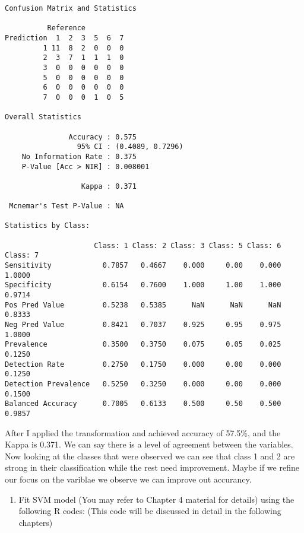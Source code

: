 \documentclass[
  letterpaper,
  DIV=11,
  numbers=noendperiod]{scrartcl}
\providecommand{\tightlist}{%
  \setlength{\itemsep}{0pt}\setlength{\parskip}{0pt}}\usepackage{longtable,booktabs,array}
\begin{document}
\begin{verbatim}
Confusion Matrix and Statistics

          Reference
Prediction  1  2  3  5  6  7
         1 11  8  2  0  0  0
         2  3  7  1  1  1  0
         3  0  0  0  0  0  0
         5  0  0  0  0  0  0
         6  0  0  0  0  0  0
         7  0  0  0  1  0  5

Overall Statistics
                                          
               Accuracy : 0.575           
                 95% CI : (0.4089, 0.7296)
    No Information Rate : 0.375           
    P-Value [Acc > NIR] : 0.008001        
                                          
                  Kappa : 0.371           
                                          
 Mcnemar's Test P-Value : NA              

Statistics by Class:

                     Class: 1 Class: 2 Class: 3 Class: 5 Class: 6 Class: 7
Sensitivity            0.7857   0.4667    0.000     0.00    0.000   1.0000
Specificity            0.6154   0.7600    1.000     1.00    1.000   0.9714
Pos Pred Value         0.5238   0.5385      NaN      NaN      NaN   0.8333
Neg Pred Value         0.8421   0.7037    0.925     0.95    0.975   1.0000
Prevalence             0.3500   0.3750    0.075     0.05    0.025   0.1250
Detection Rate         0.2750   0.1750    0.000     0.00    0.000   0.1250
Detection Prevalence   0.5250   0.3250    0.000     0.00    0.000   0.1500
Balanced Accuracy      0.7005   0.6133    0.500     0.50    0.500   0.9857
\end{verbatim}

After I applied the transformation and achieved accuracy of 57.5\%, and
the Kappa is 0.371. We can say there is a level of agreement between the
variables. Now looking at the classes that were observed we can see that
class 1 and 2 are strong in their classification while the rest need
improvement. Maybe if we refine our focus on the variblae we observe we
can improve out accurancy.

\begin{enumerate}
\def\labelenumi{\alph{enumi})}
\setcounter{enumi}{3}
\tightlist
\item
  Fit SVM model (You may refer to Chapter 4 material for details) using
  the following R codes: (This code will be discussed in detail in the
  following chapters)
\end{enumerate}
\end{document}
